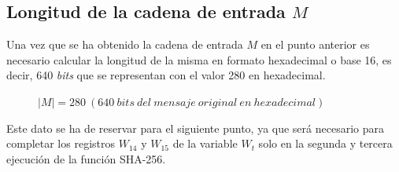 \documentclass{article}
\begin{document}
    \subsection{Longitud de la cadena de entrada $M$}
        Una vez que se ha obtenido la cadena de entrada $M$ en el punto anterior es necesario calcular la longitud de la misma en formato hexadecimal o base 16, es decir, 640 \textit{bits} que se representan con el valor 280 en hexadecimal.
        \begin{figure}[H]
        \centering
            $|M| = 280\ (640\ bits\ del\ mensaje\ original\ en\ hexadecimal)$
        \end{figure}
        Este dato se ha de reservar para el siguiente punto, ya que será necesario para completar los registros $W_{14}$ y $W_{15}$ de la variable $W_t$ solo en la segunda y tercera ejecución de la función SHA-256.
    
\end{document}

